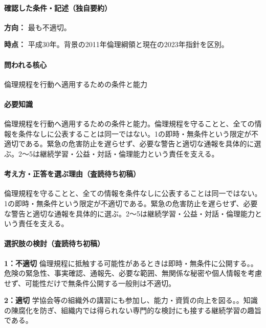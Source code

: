 \paragraph{確認した条件・記述（独自要約）}\mbox{}\par

\noindent\textbf{方向：} 最も不適切。\par

\noindent\textbf{時点：} 平成30年。背景の2011年倫理綱領と現在の2023年指針を区別。\par

\paragraph{問われる核心} 倫理規程を行動へ適用するための条件と能力

\paragraph{必要知識} 倫理規程を行動へ適用するための条件と能力。倫理規程を守ることと、全ての情報を条件なしに公表することは同一ではない。1の即時・無条件という限定が不適切である。緊急の危害防止を遅らせず、必要な警告と適切な通報を具体的に選ぶ。2〜5は継続学習・公益・対話・倫理能力という責任を支える。

\paragraph{考え方・正答を選ぶ理由（査読待ち初稿）} 倫理規程を守ることと、全ての情報を条件なしに公表することは同一ではない。1の即時・無条件という限定が不適切である。緊急の危害防止を遅らせず、必要な警告と適切な通報を具体的に選ぶ。2〜5は継続学習・公益・対話・倫理能力という責任を支える。

\paragraph{選択肢の検討（査読待ち初稿）}\mbox{}\par

\noindent\textbf{1：不適切} 倫理規程に抵触する可能性があるときは即時・無条件に公開する。。危険の緊急性、事実確認、通報先、必要な範囲、無関係な秘密や個人情報を考慮せず、可能性だけで無条件公開する一般則は不適切。\par

\noindent\textbf{2：適切} 学協会等の組織外の講習にも参加し、能力・資質の向上を図る。。知識の陳腐化を防ぎ、組織内では得られない専門的な検討にも接する継続学習の趣旨である。\par

